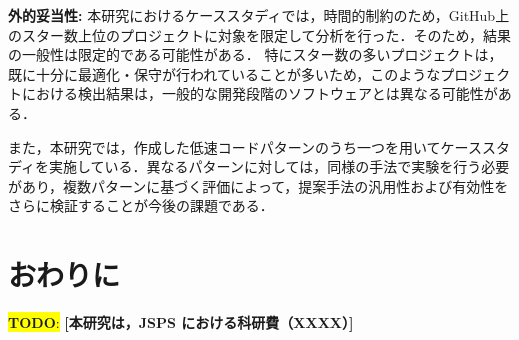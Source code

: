 \documentclass[submit,techrep,noauthor]{ipsj}
\newcommand{\todo}[1]{\colorbox{yellow}{{\bf TODO}:}{\color{red} {\textbf{[#1]}}}}
\begin{document}
\noindent\textbf{外的妥当性: }
本研究におけるケーススタディでは，時間的制約のため，GitHub上のスター数上位のプロジェクトに対象を限定して分析を行った．そのため，結果の一般性は限定的である可能性がある．
特にスター数の多いプロジェクトは，既に十分に最適化・保守が行われていることが多いため，このようなプロジェクトにおける検出結果は，一般的な開発段階のソフトウェアとは異なる可能性がある．

また，本研究では，作成した低速コードパターンのうち一つを用いてケーススタディを実施している．異なるパターンに対しては，同様の手法で実験を行う必要があり，複数パターンに基づく評価によって，提案手法の汎用性および有効性をさらに検証することが今後の課題である．


\section{おわりに}
\label{sec:summary}

\begin{acknowledgment}
\todo{本研究は，JSPS における科研費（XXXX）}
\end{acknowledgment}





\end{document}
